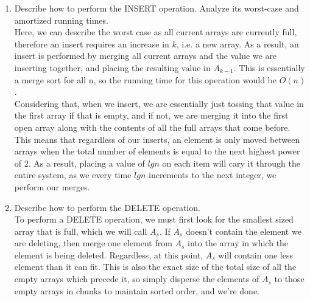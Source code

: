 \documentclass{article}
\begin{document}
\begin{enumerate}
\begin{enumerate}[label=(\alph*)]
        \item Describe how to perform the INSERT operation. Analyze its worst-case and amortized running times.
        \\[\medskipamount]
        Here, we can describe the worst case as all current arrays are currently full, therefore an insert requires an increase in \(k\), i.e. a new array. As a result, an insert is performed by merging all current arrays and the value we are inserting together, and placing the resulting value in \(A_{k-1}\). This is essentially a merge sort for all n, so the running time for this operation would be \(O(n)\).
        \\[\medskipamount]
        Considering that, when we insert, we are essentially just tossing that value in the first array if that is empty, and if not, we are merging it into the first open array along with the contents of all the full arrays that come before. This means that regardless of our inserts, an element is only moved between arrays when the total number of elements is equal to the next highest power of 2. As a result, placing a value of \(lgn\) on each item will cary it through the entire system, as we every time \(lgn\) increments to the next integer, we perform our merges.
        
        \item Describe how to perform the DELETE operation.
        \\[\medskipamount]
        To perform a DELETE operation, we must first look for the smallest sized array that is full, which we will call \(A_s\). If \(A_s\) doesn't contain the element we are deleting, then merge one element from \(A_s\) into the array in which the element is being deleted. Regardless, at this point, \(A_s\) will contain one less element than it can fit. This is also the exact size of the total size of all the empty arrays which precede it, so simply disperse the elements of \(A_s\) to those empty arrays in chunks to maintain sorted order, and we're done.
        
    \end{enumerate}
\end{enumerate}
\end{document}
